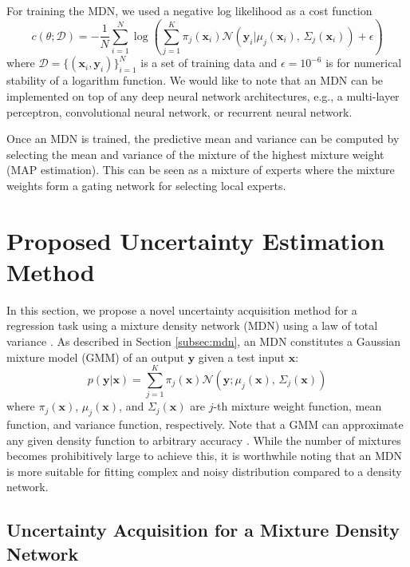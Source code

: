 \documentclass[letterpaper, 10 pt, conference]{ieeeconf}  %
\def\Bx{\mathbf{x}} \def\By{\mathbf{y}} \def\Bp{\mathbf{p}}
\begin{document}
For training the MDN, we used a negative log likelihood 
as a cost function
\begin{equation}
	c(\theta ; \mathcal{D}) = 
		-\frac{1}{N}
		\sum_{i=1}^N
		\log
		(
			\sum_{j=1}^K \pi_j(\Bx_i) 
				\mathcal{N}(\By_i | \mu_j(\Bx_i), \, \Sigma_j(\Bx_i))
			+ \epsilon
		)
\end{equation}
where $\mathcal{D} = \{(\Bx_{i}, \By_{i}) \}_{i=1}^N$
is a set of training data and $\epsilon=10^{-6}$ is for numerical 
stability of a logarithm function. 
We would like to note that an MDN can be implemented 
on top of any deep neural network architectures, 
e.g., a multi-layer perceptron, convolutional neural network, 
or recurrent neural network. 

Once an MDN is trained, the predictive mean and variance 
can be computed by selecting the mean and variance of the
mixture of the highest mixture weight (MAP estimation).
This can be seen as a mixture of experts \cite{Shazeer_17}
where the mixture weights form a gating network for 
selecting local experts. 

\section{Proposed Uncertainty Estimation Method} \label{sec:unct}

In this section, we propose a novel uncertainty acquisition method
for a regression task using a mixture density network (MDN)
using a law of total variance \cite{Duda_73}.
As described in Section \ref{subsec:mdn}, an MDN 
constitutes a Gaussian mixture model (GMM) 
of an output $\mathbf{y}$ 
given a test input $\mathbf{x}$:
\begin{equation} \label{eq:GMM}
	p(\mathbf{y}|\mathbf{x})
		= \sum_{j=1}^{K}\pi_{j}(\mathbf{x})
		\mathcal{N}\left(
			\mathbf{y};\mu_{j}(\mathbf{x}), \, \Sigma_{j}(\mathbf{x})
			\right)
\end{equation}
where $\pi_j(\mathbf{x})$, $\mu_j(\mathbf{x})$, and $ \Sigma_{j}(\mathbf{x}) $
are $j$-th mixture weight function, mean function, and variance function, 
respectively. 
Note that a GMM can approximate any given density function 
to arbitrary accuracy \cite{Mclachlan_88}.
While the number of mixtures becomes prohibitively large
to achieve this, it is worthwhile noting that an MDN is more suitable for fitting
complex and noisy distribution compared to a density network. 


\subsection{Uncertainty Acquisition for a Mixture Density Network}
\end{document}
